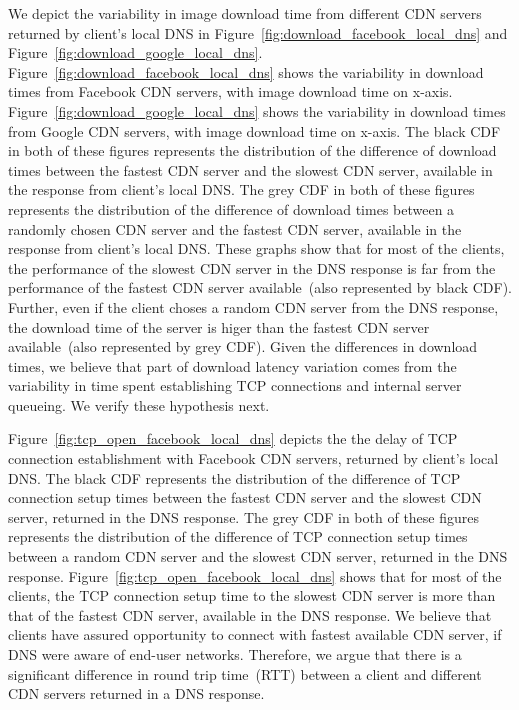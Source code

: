 \documentclass{llncs}
\begin{document}
We depict the variability in image download time from different CDN servers returned by client's local DNS in Figure~\ref{fig:download_facebook_local_dns} and Figure~\ref{fig:download_google_local_dns}.
Figure~\ref{fig:download_facebook_local_dns} shows the variability in download times from Facebook CDN servers, with image download time on x-axis.
Figure~\ref{fig:download_google_local_dns} shows the variability in download times from Google CDN servers, with image download time on x-axis.
The black CDF in both of these figures represents the distribution of the difference of download times between the fastest CDN server and the slowest CDN server, available in the response from client's local DNS.
The grey CDF in both of these figures represents the distribution of the difference of download times between a randomly chosen CDN server and the fastest CDN server, available in the response from client's local DNS.
These graphs show that for most of the clients, the performance of the slowest CDN server in the DNS response is far from the performance of the fastest CDN server available~(also represented by black CDF).
Further, even if the client choses a random CDN server from the DNS response, the download time of the server is higer than the fastest CDN server available~(also represented by grey CDF).
Given the differences in download times, we believe that part of download latency variation comes from the variability in time spent establishing TCP connections and internal server queueing.
We verify these hypothesis next.


Figure~\ref{fig:tcp_open_facebook_local_dns} depicts the the delay of TCP connection establishment with Facebook CDN servers, returned by client's local DNS.
The black CDF represents the distribution of the difference of TCP connection setup times between the fastest CDN server and the slowest CDN server, returned in the DNS response.
The grey CDF in both of these figures represents the distribution of the difference of TCP connection setup times between a random CDN server and the slowest CDN server, returned in the DNS response.
Figure~\ref{fig:tcp_open_facebook_local_dns} shows that for most of the clients, the TCP connection setup time to the slowest CDN server is more than that of the fastest CDN server, available in the DNS response.
We believe that clients have assured opportunity to connect with fastest available CDN server, if DNS were aware of end-user networks.
Therefore, we argue that there is a significant difference in round trip time~(RTT) between a client and different CDN servers returned in a DNS response.
\end{document}
